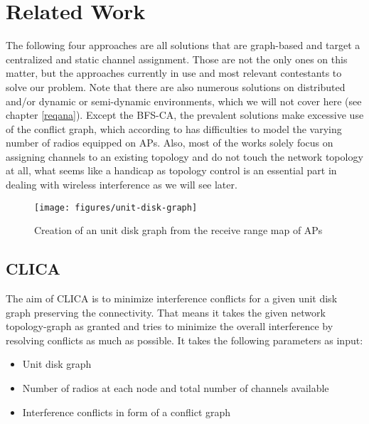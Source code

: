 \chapter{Related Work}
  The following four approaches are all solutions that are graph-based and target a centralized and static channel assignment.
  Those are not the only ones on this matter, but the approaches currently in use and most relevant contestants to solve our problem.
  Note that there are also numerous solutions on distributed and/or dynamic or semi-dynamic environments, which we will not cover here (see chapter \ref{reqana}).
  Except the \ac{BFS-CA}, the prevalent solutions make excessive use of the conflict graph, which according to \cite{overview_caa} has difficulties to model 
  the varying number of radios equipped on APs. Also, most of the works solely focus on assigning channels to an existing topology and do not touch 
  the network topology at all, what seems like a handicap as topology control is an essential part in dealing with wireless interference as we will see later.
  
  \begin{figure}[h!]
    \centering
    \texttt{[image: figures/unit-disk-graph]}
    \caption{Creation of an unit disk graph from the receive range map of APs}
    \label{fig:unit-disk-graph}
  \end{figure}
  
  \section{\ac{CLICA}}
    The aim of \ac{CLICA} \cite{CLICA} is to minimize interference conflicts for a given unit disk graph preserving the connectivity.
    That means it takes the given network topology-graph as granted and tries to minimize the overall interference by resolving conflicts as much as possible.
    It takes the following parameters as input:
    
    \begin{itemize}
      \item Unit disk graph
      
      \item Number of radios at each node and total number of channels available
      
      \item Interference conflicts in form of a conflict graph
    \end{itemize}
    
